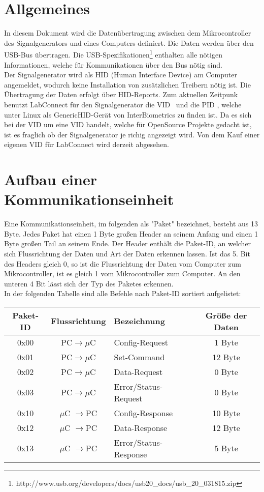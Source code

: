 \section{Allgemeines}
In diesem Dokument wird die Datenübertragung zwischen dem Mikrocontroller des Signalgenerators und eines Computers definiert. Die Daten werden über den USB-Bus übertragen. Die USB-Spezifikationen\footnote{http://www.usb.org/developers/docs/usb20\_docs/usb\_20\_031815.zip} enthalten alle nötigen Informationen, welche für Kommunikationen über den Bus nötig sind.\\
Der Signalgenerator wird als HID (Human Interface Device) am Computer angemeldet, wodurch keine Installation von zusätzlichen Treibern nötig ist. Die Übertragung der Daten erfolgt über HID-Reports. Zum aktuellen Zeitpunk benutzt LabConnect für den Signalgenerator die VID \VID\ und die PID \PID, welche unter Linux als GenericHID-Gerät von InterBiometrics zu finden ist. Da es sich bei der VID um eine VID handelt, welche für OpenSource Projekte gedacht ist, ist es fraglich ob der Signalgenerator je richig angezeigt wird. Von dem Kauf einer eigenen VID für LabConnect wird derzeit abgesehen.

\section{Aufbau einer Kommunikationseinheit}
Eine Kommunikationseinheit, im folgenden als "Paket" bezeichnet, besteht aus 13 Byte. Jedes Paket hat einen 1 Byte großen Header an seinem Anfang und einen 1 Byte großen Tail an seinem Ende. Der Header enthält die Paket-ID, an welcher sich Flussrichtung der Daten und Art der Daten erkennen lassen. Ist das 5. Bit des Headers gleich 0, so ist die Flussrichtung der Daten vom Computer zum Mikrocontroller, ist es gleich 1 vom Mikrocontroller zum Computer. An den unteren 4 Bit lässt sich der Typ des Paketes erkennen.\\
In der folgenden Tabelle sind alle Befehle nach Paket-ID sortiert aufgelistet:\\

\begin{tabular}{c||c|l|c}
Paket-ID & Flussrichtung & Bezeichnung & Größe der Daten \\ 
\hline 
\hline
0x00 & PC$\rightarrow \mu$C & Config-Request & 1 Byte \\ 
\hline 
0x01 & PC$\rightarrow \mu$C & Set-Command & 12 Byte \\ 
\hline 
0x02 & PC$\rightarrow \mu$C & Data-Request & 0 Byte \\ 
\hline 
0x03 & PC$\rightarrow \mu$C & Error/Status-Request & 0 Byte \\ 
\hline 
0x10 & $\mu$C $\rightarrow$PC & Config-Response & 10 Byte \\  
\hline 
0x12 & $\mu$C $\rightarrow$PC & Data-Response & 12 Byte \\ 
\hline
0x13 & $\mu$C $\rightarrow$PC & Error/Status-Response & 5 Byte \\ 
\end{tabular}

